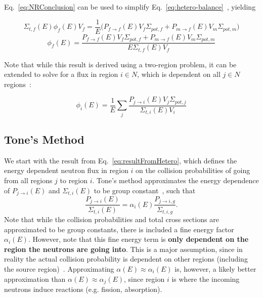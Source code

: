 \documentclass[10pt]{article}
\begin{document}
Eq.~\ref{eq:NRConclusion} can be used to simplify Eq.~\ref{eq:hetero-balance}~\cite{ch9}, yielding


\begin{equation}\Sigma_{t,f}(E)\phi_{f}(E)V_{f}=\frac{1}{E}\Big(P_{f\rightarrow f}(E)V_{f}\Sigma_{pot,f}+P_{m\rightarrow f}(E)V_{m}\Sigma_{pot,m}\Big)\end{equation}
\begin{equation}\phi_{f}(E)=\frac{P_{f\rightarrow f}(E)V_f\Sigma_{pot,f}+P_{m\rightarrow f}(E)V_m\Sigma_{pot,m}}{E\Sigma_{t,f}(E)V_f}\end{equation}

  Note that while this result is derived using a two-region problem, it can be extended to solve for a flux in region $i\in N$, which is dependent on all $j\in N$ regions~\cite{ch9}:

\begin{equation}\phi_{i}(E)=\frac{1}{E}\sum\limits_j\frac{P_{j\rightarrow i}(E)V_{j}\Sigma_{pot,j}}{\Sigma_{t,i}(E)V_{i}}\label{eq:resultFromHetero}\end{equation}




  \subsection{Tone's Method}\label{sec:tone}
We start with the result from Eq.~\ref{eq:resultFromHetero}, which defines the energy dependent neutron flux in region $i$ on the collision probabilities of going from all regions $j$ to region $i$. Tone's method approximates the energy dependence of $P_{j\rightarrow i}(E)$ and $\Sigma_{t,i}(E)$ to be group constant~\cite{ch9}, such that 
\begin{equation}\frac{P_{j\rightarrow i}(E)}{\Sigma_{t,i}(E)}=\alpha_{i}(E)\frac{P_{j\rightarrow i,g}}{\Sigma_{t,i,g}}.\label{eq:tonesApprox}\end{equation}
  Note that while the collision probabilities and total cross sections are approximated to be group constants, there is included a fine energy factor $\alpha_i(E)$. However, note that this fine energy term is \textbf{only dependent on the region the neutrons are going into}. This is a major assumption, since in reality the actual collision probability is dependent on other regions (including the source region)~\cite{ch9}. Approximating $\alpha(E)\approx\alpha_i(E)$ is, however, a likely better approximation than $\alpha(E)\approx\alpha_j(E)$, since region $i$ is where the incoming neutrons induce reactions (e.g. fission, absorption).
\end{document}

